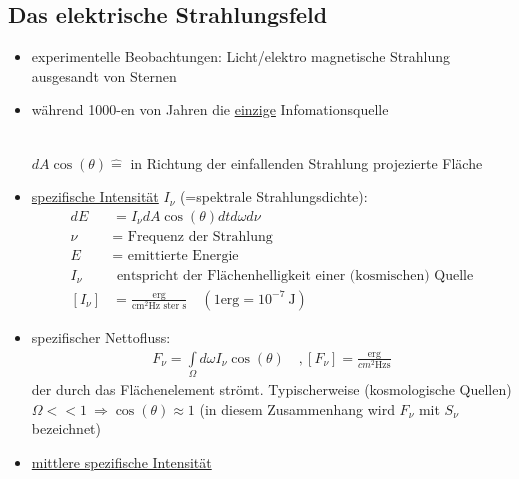 \subsection{Das elektrische Strahlungsfeld}
\begin{itemize}[label={$\to$}]
\item experimentelle Beobachtungen: Licht/elektro magnetische Strahlung ausgesandt von Sternen
\item während 1000-en von Jahren die \underline{einzige} Infomationsquelle\\
\\
$dA\cos(\theta)\hat{=}$ in Richtung der einfallenden Strahlung projezierte Fläche
\item \underline{spezifische Intensität} $I_\nu$ (=spektrale Strahlungsdichte):
\begin{align*}
dE&=I_\nu dA\cos(\theta)dtd\omega d\nu\\
\nu &= \text{ Frequenz der Strahlung}\\
E &= \text{ emittierte Energie}\\
I_\nu &\text{ entspricht der Flächenhelligkeit einer (kosmischen) Quelle}\\
[I_\nu]&=\frac{\text{erg}}{\si{\cm^2\hertz\text{ ster }\s}} \quad (1 \text{erg}=\num{10}^{-7}\ \si{\J})
\end{align*}
\item spezifischer Nettofluss:
\begin{align*}
F_\nu = \int\limits_{\Omega}d\omega I_\nu\cos(\theta)\quad ,[F_\nu]=\frac{\text{erg}}{\si{cm^2\hertz\s}}
\end{align*}
der durch das Flächenelement strömt. Typischerweise (kosmologische Quellen) $\Omega << 1\ \Rightarrow \cos(\theta)\approx 1$ (in diesem Zusammenhang wird $F_\nu$ mit $S_\nu$ bezeichnet)
\item \underline{mittlere spezifische Intensität}

\end{itemize}
